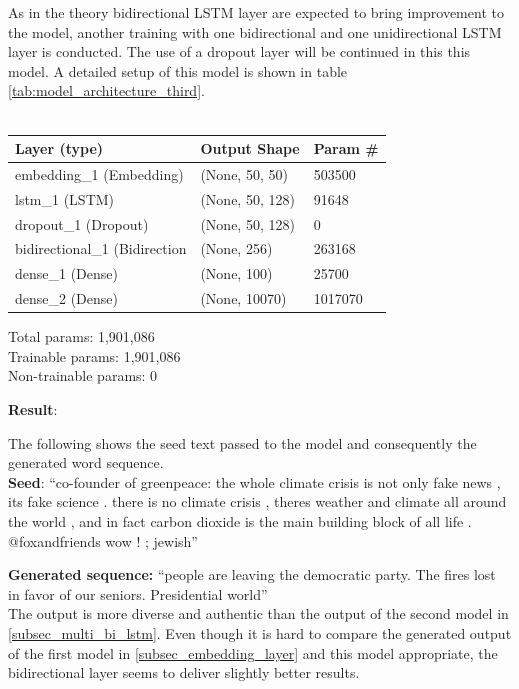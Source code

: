 \documentclass[conference]{IEEEtran}
\begin{document}
As in the theory bidirectional LSTM layer are expected to bring improvement to the model, another training with one bidirectional and one unidirectional LSTM layer is conducted. The use of a dropout layer will be continued in this this model. A detailed setup of this model is shown in table \ref{tab:model_architecture_third}.\\
\\

\begin{center}
\begin{tabular}{l l l}
\hline
Layer (type) & Output Shape & Param \#\\
\hline
\hline
embedding\_1 (Embedding) & (None, 50, 50) & 503500\\
\hline
lstm\_1 (LSTM) & (None, 50, 128) & 91648\\
\hline
dropout\_1 (Dropout) & (None, 50, 128) & 0\\
\hline
bidirectional\_1 (Bidirection & (None, 256) & 263168\\
\hline
dense\_1 (Dense) & (None, 100) & 25700\\
\hline
dense\_2 (Dense) & (None, 10070) & 1017070\\
\hline
\hline
\end{tabular}
\begin{flushleft}
Total params: 1,901,086\\
Trainable params: 1,901,086\\
Non-trainable params: 0
\end{flushleft}
\end{center}

\textbf{Result}:

The following shows the seed text passed to the model and consequently the generated word sequence.\\

\textbf{Seed}: ``co-founder of greenpeace: the whole climate crisis is not only fake news , its fake science . there is no climate crisis , theres weather and climate all around the world , and in fact carbon dioxide is the main building block of all life . @foxandfriends wow ! ; jewish''

\textbf{Generated sequence:} ``people are leaving the democratic party. The fires lost in favor of our seniors. Presidential world''\\

The output is more diverse and authentic than the output of the second model in \ref{subsec_multi_bi_lstm}. Even though it is hard to compare the generated output of the first model in \ref{subsec_embedding_layer} and this model appropriate, the bidirectional layer seems to deliver slightly better results.
\end{document}
